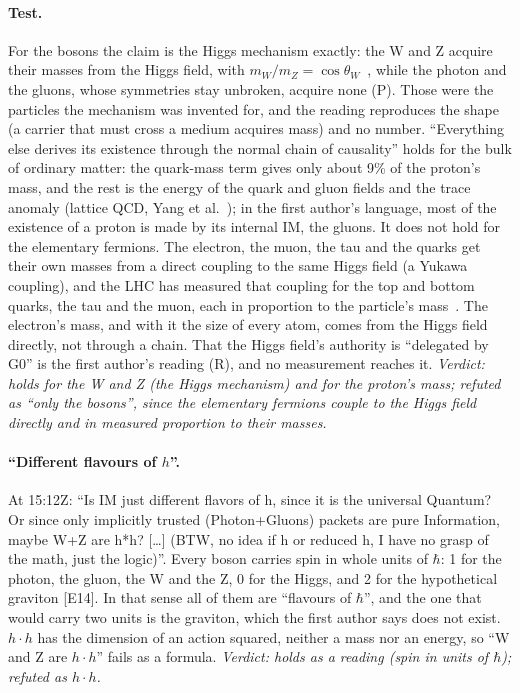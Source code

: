 \documentclass[11pt,a4paper]{article}
\theoremstyle{definition}
\theoremstyle{remark}
\newcommand{\chk}[1]{\textsf{[#1]}}
\newcommand{\tagR}{\textsf{(R)}}
\newcommand{\tagP}{\textsf{(P)}}
\begin{document}
\paragraph{Test.} For the bosons the claim is the Higgs mechanism exactly: the W and Z acquire their masses from the Higgs field, with
$m_W/m_Z=\cos\theta_W$~\cite{be,higgs}, while the photon and the gluons, whose symmetries stay unbroken, acquire none \tagP. Those were the
particles the mechanism was invented for, and the reading reproduces the shape (a carrier that must cross a medium acquires mass) and no
number. ``Everything else derives its existence through the normal chain of causality'' holds for the bulk of ordinary matter: the quark-mass
term gives only about 9\% of the proton's mass, and the rest is the energy of the quark and gluon fields and the trace anomaly (lattice QCD,
Yang et al.~\cite{yang}); in the first author's language, most of the existence of a proton is made by its internal IM, the gluons. It does
not hold for the elementary fermions. The electron, the muon, the tau and the quarks get their own masses from a direct coupling to the same
Higgs field (a Yukawa coupling), and the LHC has measured that coupling for the top and bottom quarks, the tau and the muon, each in
proportion to the particle's mass~\cite{atlas22,cms22}. The electron's mass, and with it the size of every atom, comes from the Higgs field
directly, not through a chain. That the Higgs field's authority is ``delegated by G0'' is the first author's reading \tagR, and no measurement
reaches it. \emph{Verdict: holds for the W and Z (the Higgs mechanism) and for the proton's mass; refuted as ``only the bosons'', since the
elementary fermions couple to the Higgs field directly and in measured proportion to their masses.}

\paragraph{``Different flavours of $h$''.} At 15:12Z: ``Is IM just different flavors of h, since it is the universal Quantum? Or since only
implicitly trusted (Photon+Gluons) packets are pure Information, maybe W+Z are h*h? [\dots] (BTW, no idea if h or reduced h, I have no
grasp of the math, just the logic)''. Every boson carries spin in whole units of $\hbar$: 1 for the photon, the gluon, the W and the Z, 0
for the Higgs, and 2 for the hypothetical graviton \chk{E14}. In that sense all of them are ``flavours of $\hbar$'', and the one that would
carry two units is the graviton, which the first author says does not exist. $h\cdot h$ has the dimension of an action squared, neither a
mass nor an energy, so ``W and Z are $h\cdot h$'' fails as a formula. \emph{Verdict: holds as a reading (spin in units of $\hbar$);
refuted as $h\cdot h$.}
\end{document}
